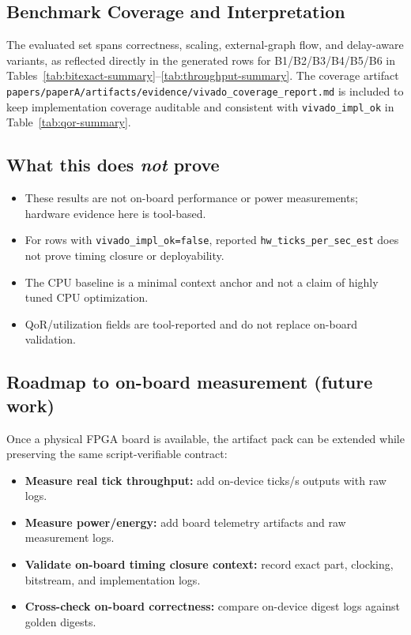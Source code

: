 \begin{table}[t]
\centering
\scriptsize

\caption{Throughput context from generated artifacts: measured CPU ticks/s and boardless HW ticks/s estimates (source: \texttt{papers/paperA/artifacts/tables/results\_throughput.csv}).}
\label{tab:throughput-summary}
\end{table}

\subsection{Benchmark Coverage and Interpretation}
The evaluated set spans correctness, scaling, external-graph flow, and delay-aware variants, as reflected directly in the generated rows for B1/B2/B3/B4/B5/B6 in Tables~\ref{tab:bitexact-summary}--\ref{tab:throughput-summary}. The coverage artifact \texttt{papers/paperA/artifacts/evidence/vivado\_coverage\_report.md} is included to keep implementation coverage auditable and consistent with \texttt{vivado\_impl\_ok} in Table~\ref{tab:qor-summary}.

\subsection{What this does \emph{not} prove}
\begin{itemize}
\item These results are not on-board performance or power measurements; hardware evidence here is tool-based.
\item For rows with \texttt{vivado\_impl\_ok=false}, reported \texttt{hw\_ticks\_per\_sec\_est} does not prove timing closure or deployability.
\item The CPU baseline is a minimal context anchor and not a claim of highly tuned CPU optimization.
\item QoR/utilization fields are tool-reported and do not replace on-board validation.
\end{itemize}

\subsection{Roadmap to on-board measurement (future work)}
Once a physical FPGA board is available, the artifact pack can be extended while preserving the same script-verifiable contract:
\begin{itemize}
\item \textbf{Measure real tick throughput:} add on-device ticks/s outputs with raw logs.
\item \textbf{Measure power/energy:} add board telemetry artifacts and raw measurement logs.
\item \textbf{Validate on-board timing closure context:} record exact part, clocking, bitstream, and implementation logs.
\item \textbf{Cross-check on-board correctness:} compare on-device digest logs against golden digests.
\end{itemize}

